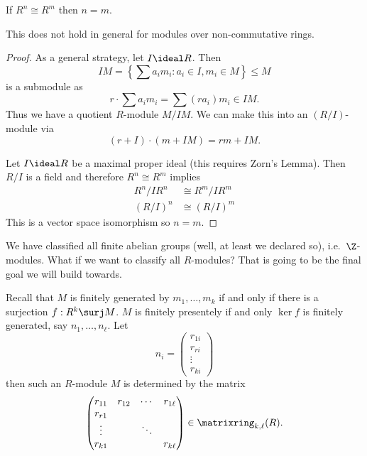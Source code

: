 \documentclass[a4paper]{article}
\theoremstyle{definition}
\begin{document}
\begin{proposition}
  If \(R^n \cong R^m\) then \(n = m\).
\end{proposition}

\begin{note}
  This does not hold in general for modules over non-commutative rings.
\end{note}

\begin{proof}
  As a general strategy, let \(I \ideal R\). Then
  \[
    IM = \left\{\sum a_im_i: a_i \in I, m_i \in M \right\} \leq M
  \]
  is a submodule as
  \[
    r \cdot \sum a_im_i = \sum (ra_i)m_i \in IM.
  \]
  Thus we have a quotient \(R\)-module \(M/IM\). We can make this into an \((R/I)\)-module via
  \[
    (r + I) \cdot (m + IM) = rm + IM.
  \]

  Let \(I \ideal R\) be a maximal proper ideal (this requires Zorn's Lemma). Then \(R/I\) is a field and therefore \(R^n \cong R^m\) implies
  \begin{align*}
    R^n/IR^n &\cong R^m/IR^m \\
    (R/I)^n &\cong (R/I)^m
  \end{align*}
  This is a vector space isomorphism so \(n = m\).
\end{proof}

We have classified all finite abelian groups (well, at least we declared so), i.e.\ \(\Z\)-modules. What if we want to classify all \(R\)-modules? That is going to be the final goal we will build towards.

Recall that \(M\) is finitely generated by \(m_1, \dots, m_k\) if and only if there is a surjection \(f: R^k \surj M\). \(M\) is finitely presentely if and only \(\ker f\) is finitely generated, say \(n_1, \dots, n_\ell\). Let
\[
  n_i =
  \begin{pmatrix}
    r_{1i} \\
    r_{ri} \\
    \vdots \\
    r_{ki}
  \end{pmatrix}
\]
then such an \(R\)-module \(M\) is determined by the matrix
\[
  \begin{pmatrix}
    r_{11} & r_{12} & \cdots & r_{1\ell} \\
    r_{r1} & & & \\
    \vdots & & \ddots & \\
    r_{k1} & & & r_{k\ell}
  \end{pmatrix}
  \in \matrixring_{k, \ell}(R).
\]
\end{document}
